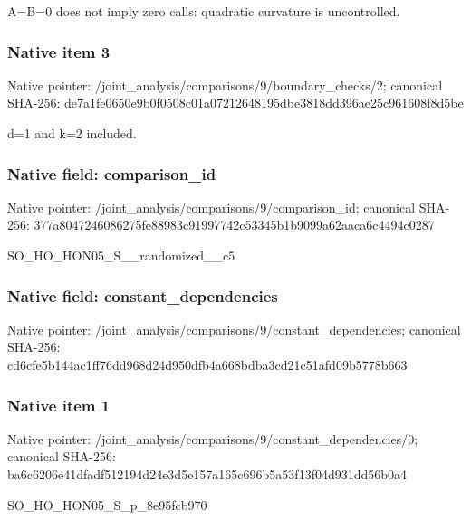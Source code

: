 \documentclass[10pt,a4paper]{article}
\begin{document}
\begingroup\raggedright\sloppy A=\allowbreak{}B=\allowbreak{}0 does not imply zero calls:\allowbreak{} quadratic curvature is uncontrolled.\par\endgroup

\subsubsection{Native item 3}
Native pointer: /joint\_\allowbreak{}analysis/comparisons/9/boundary\_\allowbreak{}checks/2; canonical SHA-256: de7a1fe0650e9b0f0508c01a07212648195dbe3818dd396ae25c961608f8d5be

\begingroup\raggedright\sloppy d=\allowbreak{}1 and k=\allowbreak{}2 included.\par\endgroup

\subsubsection{Native field: comparison\_\allowbreak{}id}
Native pointer: /joint\_\allowbreak{}analysis/comparisons/9/comparison\_\allowbreak{}id; canonical SHA-256: 377a8047246086275fe88983c91997742c53345b1b9099a62aaca6c4494c0287

\begingroup\raggedright\sloppy SO\_\allowbreak{}HO\_\allowbreak{}HON05\_\allowbreak{}S\_\allowbreak{}\_\allowbreak{}randomized\_\allowbreak{}\_\allowbreak{}c5\par\endgroup

\subsubsection{Native field: constant\_\allowbreak{}dependencies}
Native pointer: /joint\_\allowbreak{}analysis/comparisons/9/constant\_\allowbreak{}dependencies; canonical SHA-256: cd6cfe5b144ac1ff76dd968d24d950dfb4a668bdba3cd21c51afd09b5778b663

\subsubsection{Native item 1}
Native pointer: /joint\_\allowbreak{}analysis/comparisons/9/constant\_\allowbreak{}dependencies/0; canonical SHA-256: ba6c6206e41dfadf512194d24e3d5e157a165c696b5a53f13f04d931dd56b0a4

\begingroup\raggedright\sloppy SO\_\allowbreak{}HO\_\allowbreak{}HON05\_\allowbreak{}S\_\allowbreak{}p\_\allowbreak{}8e95fcb970\par\endgroup
\end{document}
